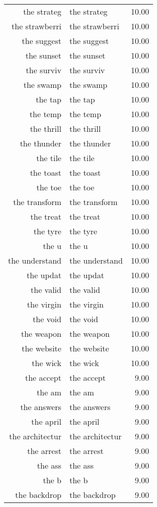 \begin{table}[ht]
\begin{tabular}{rlr}
  the strateg & the strateg & 10.00 \\ 
  the strawberri & the strawberri & 10.00 \\ 
  the suggest & the suggest & 10.00 \\ 
  the sunset & the sunset & 10.00 \\ 
  the surviv & the surviv & 10.00 \\ 
  the swamp & the swamp & 10.00 \\ 
  the tap & the tap & 10.00 \\ 
  the temp & the temp & 10.00 \\ 
  the thrill & the thrill & 10.00 \\ 
  the thunder & the thunder & 10.00 \\ 
  the tile & the tile & 10.00 \\ 
  the toast & the toast & 10.00 \\ 
  the toe & the toe & 10.00 \\ 
  the transform & the transform & 10.00 \\ 
  the treat & the treat & 10.00 \\ 
  the tyre & the tyre & 10.00 \\ 
  the u & the u & 10.00 \\ 
  the understand & the understand & 10.00 \\ 
  the updat & the updat & 10.00 \\ 
  the valid & the valid & 10.00 \\ 
  the virgin & the virgin & 10.00 \\ 
  the void & the void & 10.00 \\ 
  the weapon & the weapon & 10.00 \\ 
  the website & the website & 10.00 \\ 
  the wick & the wick & 10.00 \\ 
  the accept & the accept & 9.00 \\ 
  the am & the am & 9.00 \\ 
  the answers & the answers & 9.00 \\ 
  the april & the april & 9.00 \\ 
  the architectur & the architectur & 9.00 \\ 
  the arrest & the arrest & 9.00 \\ 
  the ass & the ass & 9.00 \\ 
  the b & the b & 9.00 \\ 
  the backdrop & the backdrop & 9.00 \\ 

\end{tabular}
\end{table}
